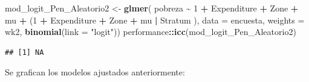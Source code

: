 \documentclass[
  spanish,
  12pt,
]{book}
\newenvironment{Shaded}{\begin{snugshade}}{\end{snugshade}}
\newcommand{\AttributeTok}[1]{\textcolor[rgb]{0.13,0.29,0.53}{#1}}
\newcommand{\DecValTok}[1]{\textcolor[rgb]{0.00,0.00,0.81}{#1}}
\newcommand{\FunctionTok}[1]{\textcolor[rgb]{0.13,0.29,0.53}{\textbf{#1}}}
\newcommand{\NormalTok}[1]{#1}
\newcommand{\OtherTok}[1]{\textcolor[rgb]{0.56,0.35,0.01}{#1}}
\newcommand{\SpecialCharTok}[1]{\textcolor[rgb]{0.81,0.36,0.00}{\textbf{#1}}}
\newcommand{\StringTok}[1]{\textcolor[rgb]{0.31,0.60,0.02}{#1}}
\begin{document}
\begin{Shaded}
\begin{Highlighting}[]
\NormalTok{mod\_logit\_Pen\_Aleatorio2 }\OtherTok{\textless{}{-}} \FunctionTok{glmer}\NormalTok{(}
\NormalTok{  pobreza }\SpecialCharTok{\textasciitilde{}} \DecValTok{1} \SpecialCharTok{+}\NormalTok{ Expenditure }\SpecialCharTok{+}\NormalTok{ Zone }\SpecialCharTok{+}\NormalTok{ mu }\SpecialCharTok{+}
\NormalTok{    (}\DecValTok{1} \SpecialCharTok{+}\NormalTok{ Expenditure }\SpecialCharTok{+}\NormalTok{ Zone }\SpecialCharTok{+}\NormalTok{ mu }\SpecialCharTok{|}\NormalTok{ Stratum ),}
    \AttributeTok{data =}\NormalTok{ encuesta, }\AttributeTok{weights  =}\NormalTok{  wk2, }
  \FunctionTok{binomial}\NormalTok{(}\AttributeTok{link =} \StringTok{"logit"}\NormalTok{))}
\NormalTok{performance}\SpecialCharTok{::}\FunctionTok{icc}\NormalTok{(mod\_logit\_Pen\_Aleatorio2)}
\end{Highlighting}
\end{Shaded}

\begin{verbatim}
## [1] NA
\end{verbatim}

Se grafican los modelos ajustados anteriormente:
\end{document}
